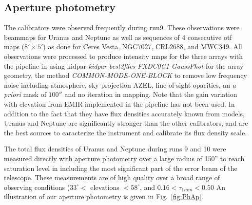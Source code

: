 \subsection{Aperture photometry}

The calibrators were observed frequently during run9. These observations were beammaps for Uranus and Neptune
as well as  sequences of 4 consecutive
otf maps ($8' \times 5'$) as done for Ceres Vesta, NGC7027, CRL2688, and MWC349. All observations were processed 
to produce intensity maps for the three arrays with the pipeline  in
using kidpar
{\it kidpar-best3files-FXDC0C1-GaussPhot} for the array geometry,
the method {\it COMMON-MODE-ONE-BLOCK}  to remove
 low frequency noise including atmosphere,
sky projection AZEL, line-of-sight opacities, an {\it a priori} mask of $100''$ and no iteration in mapping.
Note that the gain variation with elevation from EMIR implemented in the pipeline has not been used. 
In addition to the fact that they  have flux densities accurately known from models,
Uranus and Neptune are significantly stronger than the other calibrators, and  are the best sources to caracterize the
instrument and calibrate its flux density  scale.

The total flux densities of  Uranus and Neptune during runs 9  and 10 were
measured directly with aperture photometry over a large radius of 150''
to reach saturation level in including the most significant part of the
error beam of the telescope.
These measurements are of high quality over a broad range of observing conditions
($33^{\circ}<$ elevations $<58^{\circ}$, and   $0.16 < \tau_{1mm} < 0.50$
An illustration of our aperture photometry is given in Fig.~\ref{fig:PhAp}.

